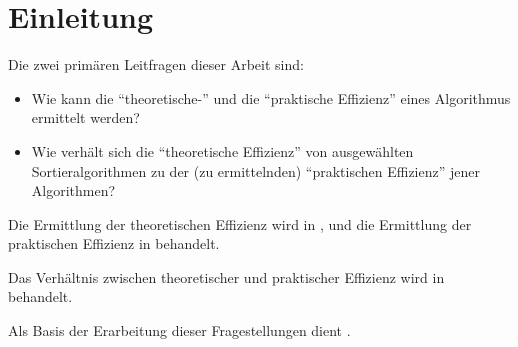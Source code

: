 \chapter*{Einleitung}


Die zwei primären Leitfragen dieser Arbeit sind:

\begin{itemize}
    \item Wie kann die \enquote{theoretische-} und die \enquote{praktische Effizienz} eines Algorithmus ermittelt werden?
    \item Wie verhält sich die \enquote{theoretische Effizienz} von ausgewählten Sortieralgorithmen zu der (zu ermittelnden) \enquote{praktischen Effizienz} jener Algorithmen?
\end{itemize}

Die Ermittlung der theoretischen Effizienz wird in , und die Ermittlung der praktischen Effizienz in  behandelt.

Das Verhältnis zwischen theoretischer und praktischer Effizienz wird in  behandelt.

Als Basis der Erarbeitung dieser Fragestellungen dient .

